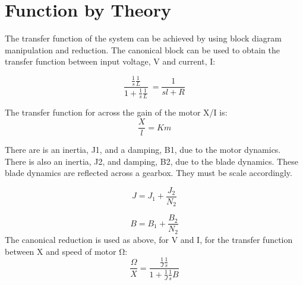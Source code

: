 \newpage
\chapter{Function by Theory}
The transfer function of the system can be achieved by using block diagram manipulation and reduction. The canonical block can be used to obtain the transfer function between input voltage, V and current, I:



\[\frac{\frac{1}{s}\frac{1}{L}}{1+\frac{1}{s}\frac{1}{L}}\ = \frac{1}{sl+R}\]



The transfer function for across the gain of the motor X/I is: 
\[\frac{X}{l}=Km\]

There are is an inertia, J1, and a damping, B1, due to the motor dynamics. There is also an inertia, J2, and damping, B2, due to the blade dynamics. These blade dynamics are reflected across a gearbox. They must be scale accordingly.

\[J=J_1+\frac{J_2}{N_2}\]

\[B=B_1+\frac{B_2}{N_2}\]
The canonical reduction is used as above, for V and I, for the transfer function between X and speed of motor Ω:
\[\frac{\Omega}{X}=\frac{\frac{1}{J}\frac{1}{s}}{1+\frac{1}{J}\frac{1}{s}B}\]